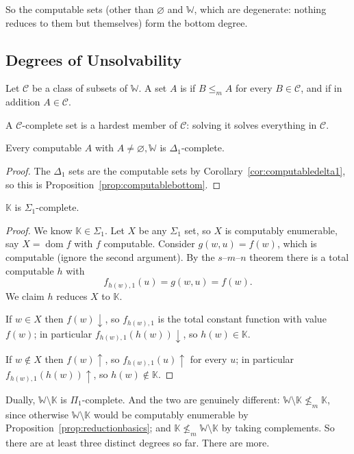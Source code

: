 \documentclass[a4paper]{scrartcl}
\newcommand{\WW}{\mathbb{W}}
\newcommand{\KK}{\mathbb{K}}
\newcommand{\dom}{\operatorname{dom}}
\begin{document}
So the computable sets (other than $\varnothing$ and $\WW$, which are degenerate: nothing reduces to them but themselves) form the bottom degree.

\subsection{Degrees of Unsolvability}

\begin{definition}
	Let $\mathcal C$ be a class of subsets of $\WW$. A set $A$ is  if $B \leq_m A$ for every $B \in \mathcal C$, and  if in addition $A \in \mathcal C$.
\end{definition}

A $\mathcal C$-complete set is a hardest member of $\mathcal C$: solving it solves everything in $\mathcal C$.

\begin{corollary}
	Every computable $A$ with $A \neq \varnothing, \WW$ is $\Delta_1$-complete.
\end{corollary}

\begin{proof}
	The $\Delta_1$ sets are the computable sets by Corollary~\ref{cor:computabledelta1}, so this is Proposition~\ref{prop:computablebottom}.
\end{proof}

\begin{theorem}\label{thm:ksigmacomplete}
	$\KK$ is $\Sigma_1$-complete.
\end{theorem}

\begin{proof}
	We know $\KK \in \Sigma_1$. Let $X$ be any $\Sigma_1$ set, so $X$ is computably enumerable, say $X = \dom f$ with $f$ computable. Consider $g(w,u) = f(w)$, which is computable (ignore the second argument). By the $s$--$m$--$n$ theorem there is a total computable $h$ with
	$$f_{h(w),1}(u) = g(w,u) = f(w).$$
	We claim $h$ reduces $X$ to $\KK$.

	If $w \in X$ then $f(w)\!\downarrow$, so $f_{h(w),1}$ is the total constant function with value $f(w)$; in particular $f_{h(w),1}(h(w))\!\downarrow$, so $h(w)\in\KK$.

	If $w \notin X$ then $f(w)\!\uparrow$, so $f_{h(w),1}(u)\!\uparrow$ for every $u$; in particular $f_{h(w),1}(h(w))\!\uparrow$, so $h(w)\notin\KK$.
\end{proof}

Dually, $\WW\setminus\KK$ is $\Pi_1$-complete. And the two are genuinely different: $\WW\setminus\KK \not\leq_m \KK$, since otherwise $\WW\setminus\KK$ would be computably enumerable by Proposition~\ref{prop:reductionbasics}; and $\KK \not\leq_m \WW\setminus\KK$ by taking complements. So there are at least three distinct degrees so far. There are more.
\end{document}
